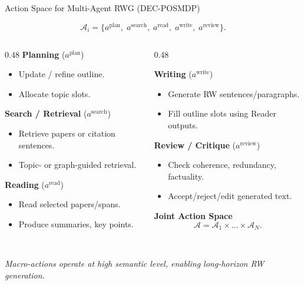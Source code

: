 \begin{frame}{Action Space for Multi-Agent RWG (DEC-POSMDP)}
\vspace{-8mm}
\small

\[
\mathcal{A}_i =
\{ a^{\mathrm{plan}},\;
   a^{\mathrm{search}},\;
   a^{\mathrm{read}},\;
   a^{\mathrm{write}},\;
   a^{\mathrm{review}} \}.
\]

\begin{columns}[T,totalwidth=\textwidth]

\begin{column}{0.48\textwidth}
\textbf{Planning} ($a^{\mathrm{plan}}$)
\begin{itemize}\itemsep1pt
  \item Update / refine outline.
  \item Allocate topic slots.
\end{itemize}

\textbf{Search / Retrieval} ($a^{\mathrm{search}}$)
\begin{itemize}\itemsep1pt
  \item Retrieve papers or citation sentences.
  \item Topic- or graph-guided retrieval.
\end{itemize}

\textbf{Reading} ($a^{\mathrm{read}}$)
\begin{itemize}\itemsep1pt
  \item Read selected papers/spans.
  \item Produce summaries, key points.
\end{itemize}
\end{column}

\begin{column}{0.48\textwidth}

\textbf{Writing} ($a^{\mathrm{write}}$)
\begin{itemize}\itemsep1pt
  \item Generate RW sentences/paragraphs.
  \item Fill outline slots using Reader outputs.
\end{itemize}

\textbf{Review / Critique} ($a^{\mathrm{review}}$)
\begin{itemize}\itemsep1pt
  \item Check coherence, redundancy, factuality.
  \item Accept/reject/edit generated text.
\end{itemize}

\vspace{2mm}
\textbf{Joint Action Space}
\[
\mathcal{A} = \mathcal{A}_1 \times \dots \times \mathcal{A}_N.
\]

\end{column}

\end{columns}

\vfill
\scriptsize
\hrulefill\\[0.3em]
\textit{Macro-actions operate at high semantic level, enabling long-horizon RW generation.}
\end{frame}


